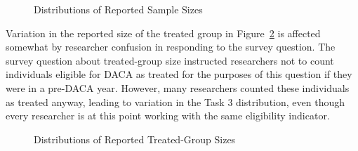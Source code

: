 \documentclass[
  letterpaper,
  DIV=11,
  numbers=noendperiod]{scrartcl}
\begin{document}
\begin{figure}


\caption{\label{fig-sample-size-distributions}Distributions of Reported
Sample Sizes}

\end{figure}%

Variation in the reported size of the treated group in
Figure~\ref{fig-treated-group-distributions} is affected somewhat by
researcher confusion in responding to the survey question. The survey
question about treated-group size instructed researchers not to count
individuals eligible for DACA as treated for the purposes of this
question if they were in a pre-DACA year. However, many researchers
counted these individuals as treated anyway, leading to variation in the
Task 3 distribution, even though every researcher is at this point
working with the same eligibility indicator.

\begin{figure}


\caption{\label{fig-treated-group-distributions}Distributions of
Reported Treated-Group Sizes}

\end{figure}%
\end{document}
